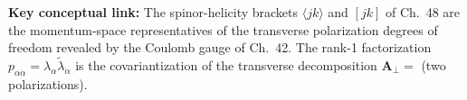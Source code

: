 \begin{mdframed}[backgroundcolor=blue!5]
\textbf{Key conceptual link:} The spinor-helicity brackets $\langle jk\rangle$ and $[jk]$
of Ch.~48 are the momentum-space representatives of the transverse polarization degrees
of freedom revealed by the Coulomb gauge of Ch.~42.  The rank-1 factorization
$p_{\alpha\dot\alpha}=\lambda_\alpha\tilde\lambda_{\dot\alpha}$ is the covariantization
of the transverse decomposition $\mathbf{A}_\perp = $ (two polarizations).
\end{mdframed}

\vfill
